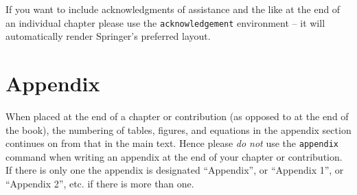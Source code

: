  \begin{acknowledgement}
If you want to include acknowledgments of assistance and the like at the end of an individual chapter please use the \verb|acknowledgement| environment -- it will automatically render Springer's preferred layout.
\end{acknowledgement}
%
\section*{Appendix}
%
%
When placed at the end of a chapter or contribution (as opposed to at the end of the book), the numbering of tables, figures, and equations in the appendix section continues on from that in the main text. Hence please \textit{do not} use the \verb|appendix| command when writing an appendix at the end of your chapter or contribution. If there is only one the appendix is designated ``Appendix'', or ``Appendix 1'', or ``Appendix 2'', etc. if there is more than one.

